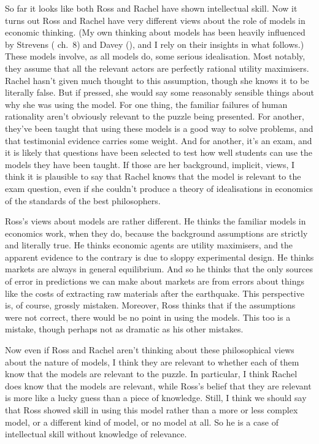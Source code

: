 \documentclass[
  11pt,
  letterpaper,
  DIV=11,
  numbers=noendperiod,
  twoside]{scrartcl}
\begin{document}
So far it looks like both Ross and Rachel have shown intellectual skill.
Now it turns out Ross and Rachel have very different views about the
role of models in economic thinking. (My own thinking about models has
been heavily influenced by Strevens (
ch.~8) and Davey (), and I rely on their
insights in what follows.) These models involve, as all models do, some
serious idealisation. Most notably, they assume that all the relevant
actors are perfectly rational utility maximisers. Rachel hasn't given
much thought to this assumption, though she knows it to be literally
false. But if pressed, she would say some reasonably sensible things
about why she was using the model. For one thing, the familiar failures
of human rationality aren't obviously relevant to the puzzle being
presented. For another, they've been taught that using these models is a
good way to solve problems, and that testimonial evidence carries some
weight. And for another, it's an exam, and it is likely that questions
have been selected to test how well students can use the models they
have been taught. If those are her background, implicit, views, I think
it is plausible to say that Rachel knows that the model is relevant to
the exam question, even if she couldn't produce a theory of
idealisations in economics of the standards of the best philosophers.

Ross's views about models are rather different. He thinks the familiar
models in economics work, when they do, because the background
assumptions are strictly and literally true. He thinks economic agents
are utility maximisers, and the apparent evidence to the contrary is due
to sloppy experimental design. He thinks markets are always in general
equilibrium. And so he thinks that the only sources of error in
predictions we can make about markets are from errors about things like
the costs of extracting raw materials after the earthquake. This
perspective is, of course, grossly mistaken. Moreover, Ross thinks that
if the assumptions were not correct, there would be no point in using
the models. This too is a mistake, though perhaps not as dramatic as his
other mistakes.

Now even if Ross and Rachel aren't thinking about these philosophical
views about the nature of models, I think they are relevant to whether
each of them know that the models are relevant to the puzzle. In
particular, I think Rachel does know that the models are relevant, while
Ross's belief that they are relevant is more like a lucky guess than a
piece of knowledge. Still, I think we should say that Ross showed skill
in using this model rather than a more or less complex model, or a
different kind of model, or no model at all. So he is a case of
intellectual skill without knowledge of relevance.
\end{document}
